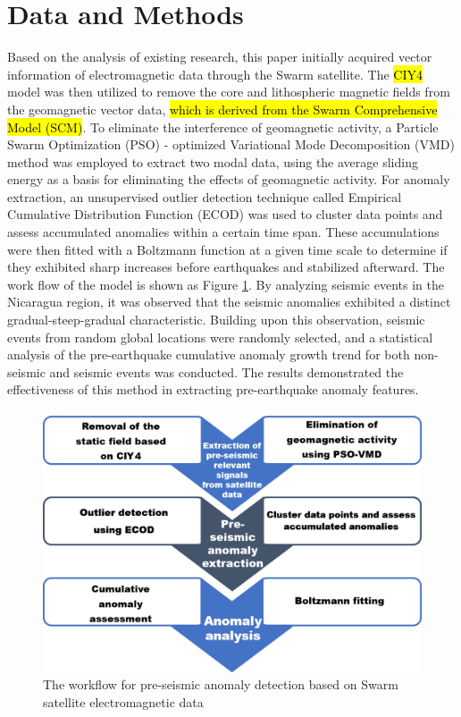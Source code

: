 \documentclass[3p,authoryear,preprint,12pt]{elsarticle}
\begin{document}
\section{Data and Methods}
Based on the analysis of existing research, this paper initially acquired vector information of electromagnetic data through the Swarm satellite. The \hl{CIY4} \citep{sabakaComprehensiveModelEarth2018} model was then utilized to remove the core and lithospheric magnetic fields from the geomagnetic vector data, \hl{which is derived from the Swarm
Comprehensive Model (SCM)}. To eliminate the interference of geomagnetic activity, a Particle Swarm Optimization (PSO) \citep{wanpengNovelHybridPSO2010} - optimized Variational Mode Decomposition (VMD) method was employed to extract two modal data, using the average sliding energy as a basis for eliminating the effects of geomagnetic activity. For anomaly extraction, an unsupervised outlier detection technique called Empirical Cumulative Distribution Function (ECOD)\citep{LiECODUnsupervisedOutlier2022} was used to cluster data points and assess accumulated anomalies within a certain time span. These accumulations were then fitted with a Boltzmann function at a given time scale to determine if they exhibited sharp increases before earthquakes and stabilized afterward. The work flow of the model is shown as Figure \ref{fig:flow}. By analyzing seismic events in the Nicaragua region, it was observed that the seismic anomalies exhibited a distinct gradual-steep-gradual characteristic. Building upon this observation, seismic events from random global locations were randomly selected, and a statistical analysis of the pre-earthquake cumulative anomaly growth trend for both non-seismic and seismic events was conducted. The results demonstrated the effectiveness of this method in extracting pre-earthquake anomaly features.
\begin{figure}[htbp]
	\centering
	\includegraphics[width=0.8\linewidth]{flow1.png}
	\caption{The workflow for pre-seismic anomaly detection based on Swarm satellite electromagnetic data}
	\label{fig:flow}
\end{figure}
\end{document}
